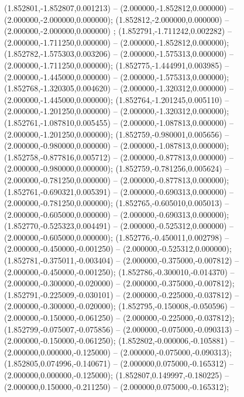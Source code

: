  (1.852801,-1.852807,0.001213) -- (2.000000,-1.852812,0.000000) -- (2.000000,-2.000000,0.000000);
 (1.852812,-2.000000,0.000000) -- (2.000000,-2.000000,0.000000) ;
 (1.852791,-1.711242,0.002282) -- (2.000000,-1.711250,0.000000) -- (2.000000,-1.852812,0.000000);
 (1.852782,-1.575303,0.003206) -- (2.000000,-1.575313,0.000000) -- (2.000000,-1.711250,0.000000);
 (1.852775,-1.444991,0.003985) -- (2.000000,-1.445000,0.000000) -- (2.000000,-1.575313,0.000000);
 (1.852768,-1.320305,0.004620) -- (2.000000,-1.320312,0.000000) -- (2.000000,-1.445000,0.000000);
 (1.852764,-1.201245,0.005110) -- (2.000000,-1.201250,0.000000) -- (2.000000,-1.320312,0.000000);
 (1.852761,-1.087810,0.005455) -- (2.000000,-1.087813,0.000000) -- (2.000000,-1.201250,0.000000);
 (1.852759,-0.980001,0.005656) -- (2.000000,-0.980000,0.000000) -- (2.000000,-1.087813,0.000000);
 (1.852758,-0.877816,0.005712) -- (2.000000,-0.877813,0.000000) -- (2.000000,-0.980000,0.000000);
 (1.852759,-0.781256,0.005624) -- (2.000000,-0.781250,0.000000) -- (2.000000,-0.877813,0.000000);
 (1.852761,-0.690321,0.005391) -- (2.000000,-0.690313,0.000000) -- (2.000000,-0.781250,0.000000);
 (1.852765,-0.605010,0.005013) -- (2.000000,-0.605000,0.000000) -- (2.000000,-0.690313,0.000000);
 (1.852770,-0.525323,0.004491) -- (2.000000,-0.525312,0.000000) -- (2.000000,-0.605000,0.000000);
 (1.852776,-0.450011,0.002798) -- (2.000000,-0.450000,-0.001250) -- (2.000000,-0.525312,0.000000);
 (1.852781,-0.375011,-0.003404) -- (2.000000,-0.375000,-0.007812) -- (2.000000,-0.450000,-0.001250);
 (1.852786,-0.300010,-0.014370) -- (2.000000,-0.300000,-0.020000) -- (2.000000,-0.375000,-0.007812);
 (1.852791,-0.225009,-0.030101) -- (2.000000,-0.225000,-0.037812) -- (2.000000,-0.300000,-0.020000);
 (1.852795,-0.150008,-0.050596) -- (2.000000,-0.150000,-0.061250) -- (2.000000,-0.225000,-0.037812);
 (1.852799,-0.075007,-0.075856) -- (2.000000,-0.075000,-0.090313) -- (2.000000,-0.150000,-0.061250);
 (1.852802,-0.000006,-0.105881) -- (2.000000,0.000000,-0.125000) -- (2.000000,-0.075000,-0.090313);
 (1.852805,0.074996,-0.140671) -- (2.000000,0.075000,-0.165312) -- (2.000000,0.000000,-0.125000);
 (1.852807,0.149997,-0.180225) -- (2.000000,0.150000,-0.211250) -- (2.000000,0.075000,-0.165312);
